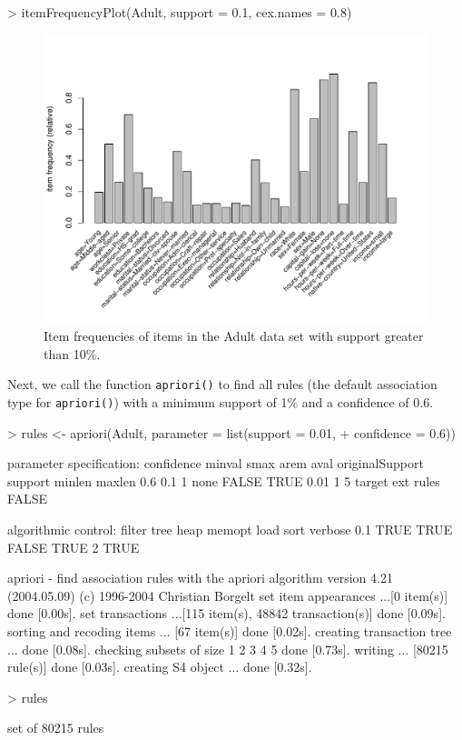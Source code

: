 \documentclass[10pt,a4paper]{article}
\newcommand{\func}[1]{\mbox{\texttt{#1()}}}
\begin{document}
\begin{Schunk}
\begin{Sinput}
> itemFrequencyPlot(Adult, support = 0.1, cex.names = 0.8)
\end{Sinput}
\end{Schunk}
\begin{figure}
\centering
\includegraphics{arules-019}
\caption{Item frequencies of items in the Adult data set with support greater than 10\%.}
\label{fig:itemFrequencyPlot}
\end{figure}

Next, we call the function
\func{apriori} to find all rules (the default association type for
\func{apriori}) with a minimum support of 1\% and a confidence of 0.6.

\begin{Schunk}
\begin{Sinput}
> rules <- apriori(Adult, parameter = list(support = 0.01, 
+     confidence = 0.6))
\end{Sinput}
\begin{Soutput}
parameter specification:
 confidence minval smax arem  aval originalSupport support minlen maxlen
        0.6    0.1    1 none FALSE            TRUE    0.01      1      5
 target   ext
  rules FALSE

algorithmic control:
 filter tree heap memopt load sort verbose
    0.1 TRUE TRUE  FALSE TRUE    2    TRUE

apriori - find association rules with the apriori algorithm
version 4.21 (2004.05.09)        (c) 1996-2004   Christian Borgelt
set item appearances ...[0 item(s)] done [0.00s].
set transactions ...[115 item(s), 48842 transaction(s)] done [0.09s].
sorting and recoding items ... [67 item(s)] done [0.02s].
creating transaction tree ... done [0.08s].
checking subsets of size 1 2 3 4 5 done [0.73s].
writing ... [80215 rule(s)] done [0.03s].
creating S4 object  ... done [0.32s].
\end{Soutput}
\begin{Sinput}
> rules
\end{Sinput}
\begin{Soutput}
set of 80215 rules 
\end{Soutput}
\end{Schunk}
\end{document}
